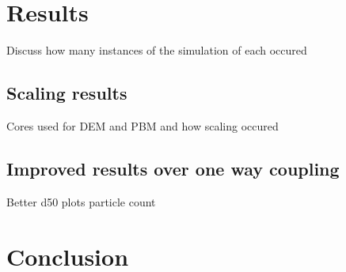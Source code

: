 \documentclass[fleqn,twoside,10pt]{article}
\begin{document}

\section{Results}
\label{results}
Discuss how many instances of the simulation of each occured
\subsection{Scaling results}
Cores used for DEM and PBM and how scaling occured
\subsection{Improved results over one way coupling}
Better d50 plots particle count
\section{Conclusion}



\end{document}
